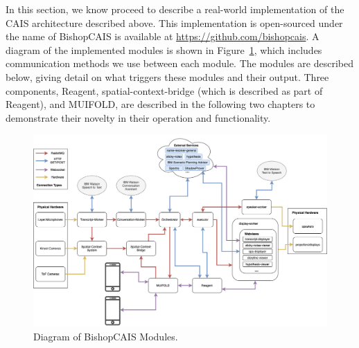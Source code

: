 
In this section, we know proceed to describe a real-world implementation of the
CAIS architecture described above. This implementation is open-sourced under the
name of BishopCAIS is available at \url{https://github.com/bishopcais}. A diagram
of the implemented modules is shown in Figure~\ref{fig:cais_implementation}, which includes
communication methods we use between each module. The modules are described below, giving detail on what
triggers these modules and their output. Three components, Reagent, 
spatial-context-bridge (which is described as part of Reagent), and MUIFOLD, are
described in the following two chapters to demonstrate their novelty in their
operation and functionality.


\begin{figure}
    \centering
    \includegraphics[width=1\columnwidth]{chapters/02_technology/figures/cais_implementation_full.png}
    \caption{Diagram of BishopCAIS Modules.}
    \label{fig:cais_implementation}
\end{figure}

